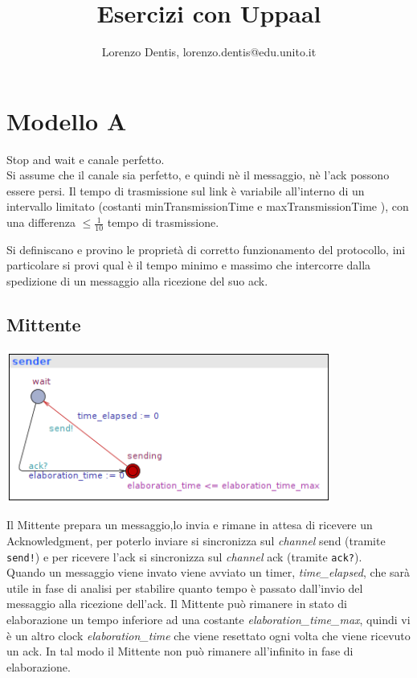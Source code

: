 \documentclass[a4paper]{article}
\newcommand{\channel}{\textit{channel }}
\begin{document}
\author{Lorenzo Dentis, lorenzo.dentis@edu.unito.it}
\title{Esercizi con Uppaal}
\maketitle
\section{Modello A}
Stop and wait e canale perfetto.\\ 
Si assume che il canale sia perfetto, e quindi nè il messaggio, nè l’ack possono essere persi. 
Il tempo di trasmissione sul link è variabile all’interno di un intervallo limitato (costanti minTransmissionTime e maxTransmissionTime ), con una differenza $\leq \frac{1}{10}$ tempo di trasmissione. 

Si definiscano e provino le proprietà di corretto funzionamento del protocollo, ini particolare si provi qual è il tempo minimo e massimo che intercorre dalla spedizione di un messaggio alla ricezione del suo ack.
\subsection{Mittente}
\begin{center}\includegraphics[width=0.8\textwidth]{1_sender.png}\end{center}
Il Mittente prepara un messaggio,lo invia e rimane in attesa di ricevere un Acknowledgment, per poterlo inviare si sincronizza sul \channel send (tramite \texttt{send!}) e per ricevere l'ack si sincronizza sul \channel ack (tramite \texttt{ack?}).\\
Quando un messaggio viene invato viene avviato un timer, \textit{time\_elapsed}, che sarà utile in fase di analisi per stabilire quanto tempo è passato dall'invio del messaggio alla ricezione dell'ack.
Il Mittente può rimanere in stato di elaborazione un tempo inferiore ad una costante \textit{elaboration\_time\_max}, quindi vi è un altro clock \textit{elaboration\_time} che viene resettato ogni volta che viene ricevuto un ack.
In tal modo il Mittente non può rimanere all'infinito in fase di elaborazione.
\end{document}
